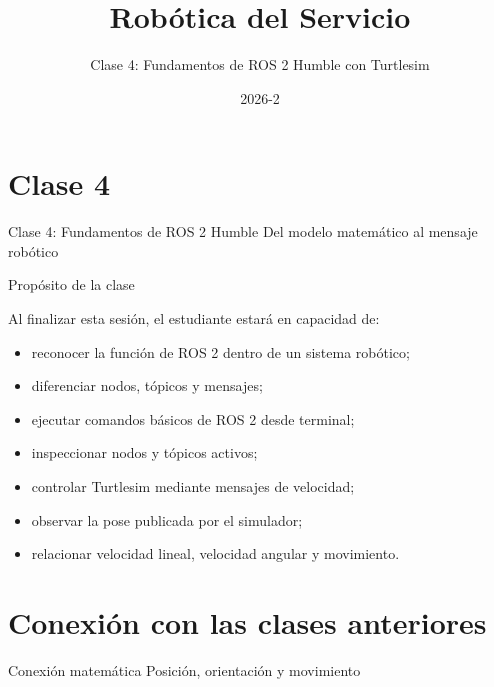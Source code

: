 \documentclass[aspectratio=169]{beamer}
\title{Robótica del Servicio}
\subtitle{Clase 4: Fundamentos de ROS 2 Humble con Turtlesim}
\author{\Instructor}
\institute{\Institution\\\Faculty}
\date{2026-2}
\begin{document}
\TitleSlide

\section{Clase 4}

\SectionSlide
{Clase 4: Fundamentos de ROS 2 Humble}
{Del modelo matemático al mensaje robótico}

\begin{frame}{Propósito de la clase}

    Al finalizar esta sesión, el estudiante estará en capacidad de:

    \begin{itemize}
        \item reconocer la función de ROS 2 dentro de un sistema robótico;
        \item diferenciar nodos, tópicos y mensajes;
        \item ejecutar comandos básicos de ROS 2 desde terminal;
        \item inspeccionar nodos y tópicos activos;
        \item controlar Turtlesim mediante mensajes de velocidad;
        \item observar la pose publicada por el simulador;
        \item relacionar velocidad lineal, velocidad angular y movimiento.
    \end{itemize}

    \vspace{0.3cm}


\end{frame}

\section{Conexión con las clases anteriores}

\SectionSlide
{Conexión matemática}
{Posición, orientación y movimiento}
\end{document}
